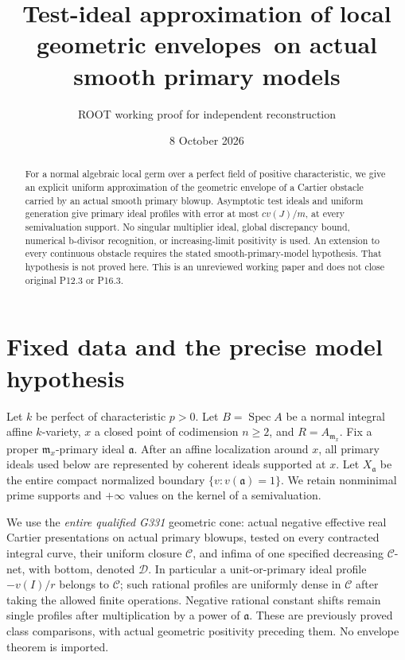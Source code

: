 \documentclass[11pt]{article}
\title{Test-ideal approximation of local geometric envelopes\ on actual smooth primary models}
\author{ROOT working proof for independent reconstruction}
\date{8 October 2026}
\newcommand{\cC}{\mathcal C}
\newcommand{\cD}{\mathcal D}
\begin{document}
\maketitle
\begin{abstract}
For a normal algebraic local germ over a perfect field of positive
characteristic, we give an explicit uniform approximation of the geometric
envelope of a Cartier obstacle carried by an actual smooth primary blowup.
Asymptotic test ideals and uniform generation give primary ideal profiles
with error at most $c v(J)/m$, at every semivaluation support. No singular
multiplier ideal, global discrepancy bound, numerical b-divisor recognition,
or increasing-limit positivity is used. An extension to every continuous
obstacle requires the stated smooth-primary-model hypothesis. That
hypothesis is not proved here. This is an unreviewed working paper and does
not close original P12.3 or P16.3.
\end{abstract}

\section{Fixed data and the precise model hypothesis}
Let $k$ be perfect of characteristic $p>0$. Let $B=\operatorname{Spec} A$
be a normal integral affine $k$-variety, $x$ a closed point of codimension
$n\geq2$, and $R=A_{\mathfrak m_x}$. Fix a proper $\mathfrak m_x$-primary
ideal $\mathfrak a$. After an affine localization around $x$, all primary
ideals used below are represented by coherent ideals supported at $x$.
Let $X_{\mathfrak a}$ be the entire compact normalized boundary
$\{v:v(\mathfrak a)=1\}$. We retain nonminimal prime supports and $+\infty$
values on the kernel of a semivaluation.

We use the \emph{entire qualified G331} geometric cone: actual negative
effective real Cartier presentations on actual primary blowups, tested on
every contracted integral curve, their uniform closure $\cC$, and infima
of one specified decreasing $\cC$-net, with bottom, denoted $\cD$.
In particular a unit-or-primary ideal profile $-v(I)/r$ belongs to $\cC$;
such rational profiles are uniformly dense in $\cC$ after taking the
allowed finite operations. Negative rational constant shifts remain
single profiles after multiplication by a power of $\mathfrak a$.
These are previously proved class comparisons, with actual geometric
positivity preceding them. No envelope theorem is imported.
\end{document}
